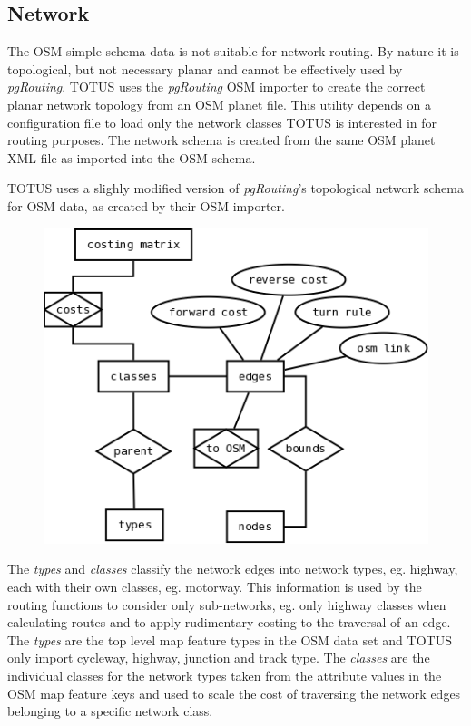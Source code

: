 \subsection{Network}
The OSM simple schema data is not suitable for network routing. By
nature it is topological, but not necessary planar and cannot be
effectively used by \textit{pgRouting}. TOTUS uses the
\textit{pgRouting} OSM importer to create the correct planar
network topology from an OSM planet file. This utility depends on a
configuration file to load only the network classes TOTUS is interested
in for routing purposes. The network schema is created from the same
OSM planet XML file as imported into the OSM schema.

TOTUS uses a slighly modified version of
\textit{pgRouting}'s topological network
schema for OSM data, as created by their OSM importer.

\begin{figure}[h]
 \centering
 \includegraphics[scale=0.4,keepaspectratio=true]{./network.png}
\end{figure}


The \textit{types} and \textit{classes} classify
the network edges into network types, eg. highway, each with their own
classes, eg. motorway. This information is used by the routing
functions to consider only sub-networks, eg. only highway classes when
calculating routes and to apply rudimentary costing to the traversal of
an edge. The \textit{types} are the top level map feature
types in the OSM data set and TOTUS only import cycleway, highway,
junction and track type. The \textit{classes} are the
individual classes for the network types taken from the attribute
values in the OSM map feature keys and used to scale the cost of
traversing the network edges belonging to a specific network class.

